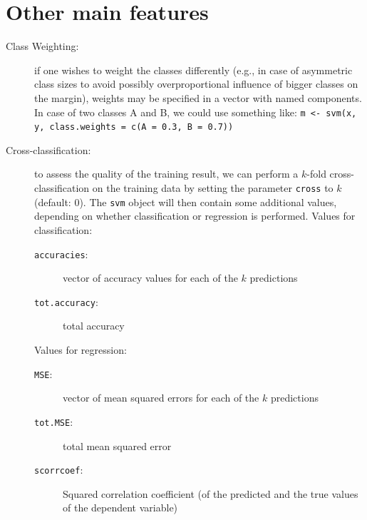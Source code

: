 \documentclass[a4paper]{article}
\begin{document}
\section*{Other main features}
\begin{description}
 \item[Class Weighting:] if one wishes to weight the classes
  differently
  (e.g., in case of asymmetric class sizes to avoid possibly
  overproportional influence of bigger classes on the margin), 
  weights may be specified in a vector with named components.
  In case of two classes A and B, we could use
  something like: \texttt{m <- svm(x, y, class.weights = c(A = 0.3, B
    = 0.7))}
 \item[Cross-classification:] to assess the quality of the
  training result, we can perform a $k$-fold cross-classification on
  the training data by setting the parameter \texttt{cross} to $k$
  (default: 0). The \texttt{svm} object will then contain some 
  additional values, depending on whether classification or regression is
  performed.
  Values for classification:
  \begin{description}
   \item[\texttt{accuracies}:] vector of accuracy values for each of the $k$
    predictions
   \item[\texttt{tot.accuracy}:] total accuracy
  \end{description}
  Values for regression:
  \begin{description}
   \item[\texttt{MSE}:] vector of mean squared errors for each of the $k$
    predictions
   \item[\texttt{tot.MSE}:] total mean squared error
   \item[\texttt{scorrcoef}:] Squared correlation coefficient (of
    the predicted and the true values of the dependent variable)
  \end{description}

\end{description}
\end{document}
